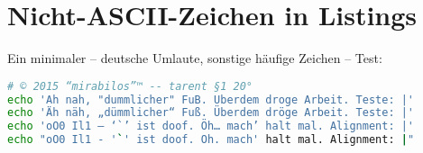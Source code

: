 \documentclass{tarentanleitung}
\begin{document}
\section{Nicht-ASCII-Zeichen in Listings}

\begin{minipage}{\textwidth}
Ein minimaler – deutsche Umlaute, sonstige häufige Zeichen – Test:

\begin{lstlisting}[language=sh]
# © 2015 “mirabilos”™ -- tarent §1 20°
echo 'Ah nah, "dummlicher" FuB. Uberdem droge Arbeit. Teste: |'
echo 'Äh näh, „dümmlicher“ Fuß. Überdem dröge Arbeit. Teste: |'
echo 'oO0 Il1 – ‘`’ ist doof. Öh… mach’ halt mal. Alignment: |'
echo "oO0 Il1 - '`' ist doof. Oh. mach' halt mal. Alignment: |"
\end{lstlisting}
\end{minipage}
\end{document}
